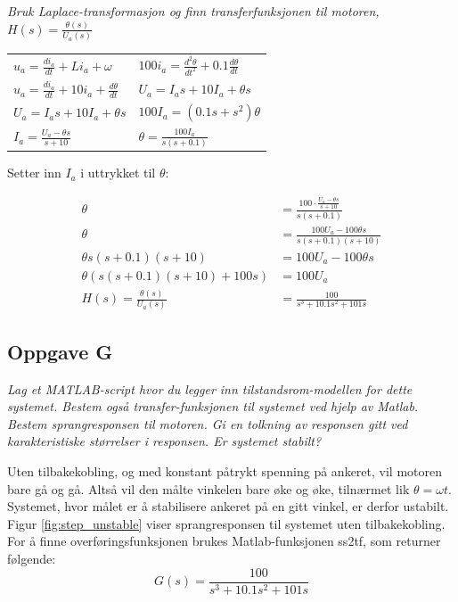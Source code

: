 \emph{Bruk Laplace-transformasjon og finn transferfunksjonen til motoren, $H(s) = \frac{\theta(s)}{U_a(s)}$}
\begin{center}
	\begin{tabular}{ll}
		$u_a = \frac{di_a}{dt} + Li_a + \omega$               & $100i_a{} = \frac{d^2\theta}{dt^2} + 0.1\frac{d\theta}{dt}$ \\
		$u_a = \frac{di_a}{dt} + 10i_a + \frac {d\theta}{dt}$ & $U_a = I_a s + 10I_a + \theta s$                            \\
		$U_a = I_a s + 10I_a + \theta s$                      & $100I_a = (0.1s + s^2) \theta$                              \\
		$I_a = \frac {U_a - \theta s} {s+10}$                 & $\theta = \frac {100I_a}{s(s+0.1)}$                         \\
		        
	\end{tabular}
\end{center}
Setter inn $I_a$ i uttrykket til $\theta$:

\begin{align*}
	\theta                             & = \frac{100 \cdot \frac{U_a-\theta s}{s+10}}{s(s+0.1)} \\
	\theta                             & = \frac{100U_a - 100\theta s}{s(s+0.1)(s+10)}          \\
	\theta s(s+0.1)(s+10)              & = 100 U_a - 100 \theta s                               \\
	\theta (s(s+0.1)(s+10) + 100s)     & = 100 U_a                                              \\
	H (s) = \frac{\theta (s)}{U_a (s)} & = \frac{100}{s^3+10.1 s^2 + 101s}                      
\end{align*}


\subsection{Oppgave G}

\emph{Lag et MATLAB-script hvor du legger inn tilstandsrom-modellen for dette systemet.
	Bestem også transfer-funksjonen til systemet ved hjelp av Matlab. Bestem
	sprangresponsen til motoren. Gi en tolkning av responsen gitt ved karakteristiske
størrelser i responsen. Er systemet stabilt?}

Uten tilbakekobling, og med konstant påtrykt spenning på ankeret, vil motoren bare gå og gå. Altså vil den målte vinkelen bare øke og øke, tilnærmet lik $\theta = \omega t$. Systemet, hvor målet er å stabilisere ankeret på en gitt vinkel, er derfor ustabilt. Figur \ref{fig:step_unstable} viser sprangresponsen til systemet uten tilbakekobling. For å finne overføringsfunksjonen brukes Matlab-funksjonen ss2tf, som returner følgende:
$$G(s) = \frac{100}{s^3 + 10.1s^2 + 101s} $$

